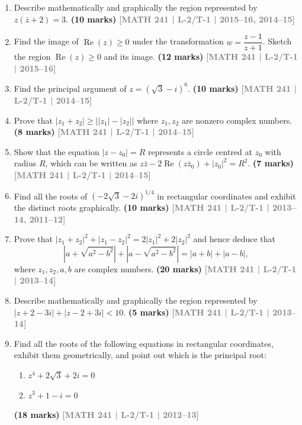 \documentclass[12pt]{article}
\newcommand{\yr}[1]{\hfill\textcolor{gray}{\small\textbf{[#1]}}}
\newcommand{\mk}[1]{\textcolor{orange!70!black}{\small\textbf{(#1 marks)}}}
\begin{document}
\begin{enumerate}
\item Describe mathematically and graphically the region represented by $z(\bar{z}+2)=3$.
\mk{10} \yr{MATH 241 | L-2/T-1 | 2015--16, 2014--15}



\item Find the image of $\operatorname{Re}(z)\ge 0$ under the transformation $w=\dfrac{z-1}{z+1}$. Sketch the region $\operatorname{Re}(z)\ge 0$ and its image.
\mk{12} \yr{MATH 241 | L-2/T-1 | 2015--16}



\item Find the principal argument of $z=(\sqrt{3}-i)^{6}$.
\mk{10} \yr{MATH 241 | L-2/T-1 | 2014--15}



\item Prove that $|z_{1}+z_{2}| \ge \bigl||z_{1}|-|z_{2}|\bigr|$ where $z_{1},z_{2}$ are nonzero complex numbers.
\mk{8} \yr{MATH 241 | L-2/T-1 | 2014--15}



\item Show that the equation $|z-z_{0}|=R$ represents a circle centred at $z_{0}$ with radius $R$, which can be written as $z\bar{z}-2\operatorname{Re}(z\bar{z}_{0})+|z_{0}|^{2}=R^{2}$.
\mk{7} \yr{MATH 241 | L-2/T-1 | 2014--15}



\item Find all the roots of $(-2\sqrt{3}-2i)^{1/4}$ in rectangular coordinates and exhibit the distinct roots graphically.
\mk{10} \yr{MATH 241 | L-2/T-1 | 2013--14, 2011--12}




\item Prove that $|z_{1}+z_{2}|^{2}+|z_{1}-z_{2}|^{2}=2|z_{1}|^{2}+2|z_{2}|^{2}$ and hence deduce that
\[
\left|a+\sqrt{a^{2}-b^{2}}\right|+\left|a-\sqrt{a^{2}-b^{2}}\right|=|a+b|+|a-b|,
\]
where $z_{1},z_{2},a,b$ are complex numbers.
\mk{20} \yr{MATH 241 | L-2/T-1 | 2013--14}



\item Describe mathematically and graphically the region represented by $|z+2-3i|+|z-2+3i|<10$.
\mk{5} \yr{MATH 241 | L-2/T-1 | 2013--14}



\item Find all the roots of the following equations in rectangular coordinates, exhibit them geometrically, and point out which is the principal root:
\begin{enumerate}
  \item $z^{4}+2\sqrt{3}+2i=0$
  \item $z^{3}+1-i=0$
\end{enumerate}
\mk{18} \yr{MATH 241 | L-2/T-1 | 2012--13}




\end{enumerate}
\end{document}
